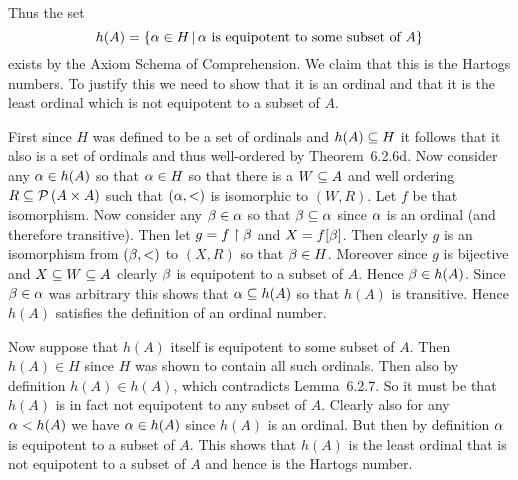 \begin{questions}
{{    Thus the set
    $$
    h(A) = \braces{\a \in H \where \text{$\a$ is equipotent to some subset of $A$}}
    $$
    exists by the Axiom Schema of Comprehension.
    We claim that this is the Hartogs numbers.
    To justify this we need to show that it is an ordinal and that it is the least ordinal which is not equipotent to a subset of $A$.

    First since $H$ was defined to be a set of ordinals and $h(A) \ss H$ it follows that it also is a set of ordinals and thus well-ordered by Theorem~6.2.6d.
    Now consider any $\a \in h(A)$ so that $\a \in H$ so that there is a $W \ss A$ and well ordering $R \ss \pset{A \times A}$ such that $(\a, <)$ is isomorphic to $(W,R)$.
    Let $f$ be that isomorphism.
    Now consider any $\b \in \a$ so that $\b \ss \a$ since $\a$ is an ordinal (and therefore transitive).
    Then let $g = f \rest \b$ and $X = f[\b]$.
    Then clearly $g$ is an isomorphism from $(\b,<)$ to $(X,R)$ so that $\b \in H$.
    Moreover since $g$ is bijective and $X \ss W \ss A$ clearly $\b$ is equipotent to a subset of $A$.
    Hence $\b \in h(A)$.
    Since $\b \in \a$ was arbitrary this shows that $\a \ss h(A)$ so that $h(A)$ is transitive.
    Hence $h(A)$ satisfies the definition of an ordinal number.

    Now suppose that $h(A)$ itself is equipotent to some subset of $A$.
    Then $h(A) \in H$ since $H$ was shown to contain all such ordinals.
    Then also by definition $h(A) \in h(A)$, which contradicts Lemma~6.2.7.
    So it must be that $h(A)$ is in fact not equipotent to any subset of $A$.
    Clearly also for any $\a < h(A)$ we have $\a \in h(A)$ since $h(A)$ is an ordinal.
    But then by definition $\a$ is equipotent to a subset of $A$.
    This shows that $h(A)$ is the least ordinal that is not equipotent to a subset of $A$ and hence is the Hartogs number.
  }
}

\end{questions}
